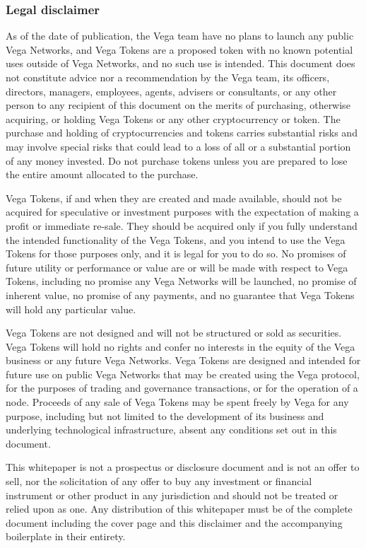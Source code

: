 \subsubsection*{Legal disclaimer}
\begin{scriptsize}
As of the date of publication, the Vega team have no plans to launch any public Vega Networks, and Vega Tokens are a proposed token with no known potential uses outside of Vega Networks, and no such use is intended. This document does not constitute advice nor a recommendation by the Vega team, its officers, directors, managers, employees, agents, advisers or consultants, or any other person to any recipient of this document on the merits of purchasing, otherwise acquiring, or holding Vega Tokens or any other cryptocurrency or token. The purchase and holding of cryptocurrencies and tokens carries substantial risks and may involve special risks that could lead to a loss of all or a substantial portion of any money invested. Do not purchase tokens unless you are prepared to lose the entire amount allocated to the purchase. 

Vega Tokens, if and when they are created and made available, should not be acquired for speculative or investment purposes with the expectation of making a profit or immediate re-sale. They should be acquired only if you fully understand the intended functionality of the Vega Tokens, and you intend to use the Vega Tokens for those purposes only, and it is legal for you to do so. No promises of future utility or performance or value are or will be made with respect to Vega Tokens, including no promise any Vega Networks will be launched, no promise of inherent value, no promise of any payments, and no guarantee that Vega Tokens will hold any particular value.
 
Vega Tokens are not designed and will not be structured or sold as securities. Vega Tokens will hold no rights and confer no interests in the equity of the Vega business or any future Vega Networks. Vega Tokens are designed and intended for future use on public Vega Networks that may be created using the Vega protocol, for the purposes of trading and governance transactions, or for the operation of a node. Proceeds of any sale of Vega Tokens may be spent freely by Vega for any purpose, including but not limited to the development of its business and underlying technological infrastructure, absent any conditions set out in this document.
 
This whitepaper is not a prospectus or disclosure document and is not an offer to sell, nor the solicitation of any offer to buy any investment or financial instrument or other product in any jurisdiction and should not be treated or relied upon as one. Any distribution of this whitepaper must be of the complete document including the cover page and this disclaimer and the accompanying boilerplate in their entirety.


\end{scriptsize}
